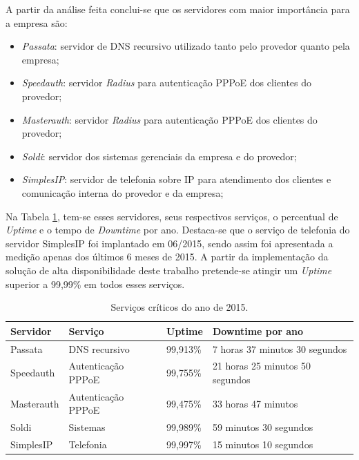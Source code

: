 A partir da análise feita conclui-se que os servidores com maior importância para a empresa são:
\begin{itemize}
 \item \textit{Passata}: servidor de \ac{DNS} recursivo utilizado tanto pelo provedor quanto pela empresa;
 \item \textit{Speedauth}: servidor \textit{Radius} para autenticação \ac{PPPoE} dos clientes do provedor;
 \item \textit{Masterauth}: servidor \textit{Radius} para autenticação \ac{PPPoE} dos clientes do provedor;
 \item \textit{Soldi}: servidor dos sistemas gerenciais da empresa e do provedor;
 \item \textit{SimplesIP}: servidor de telefonia sobre \ac{IP} para atendimento dos clientes e comunicação interna do provedor e da empresa;
\end{itemize}

Na Tabela \ref{tab:dispservcrit}, tem-se esses servidores, seus respectivos serviços, o percentual de \textit{Uptime} e o tempo de 
\textit{Downtime} por ano. Destaca-se que o serviço de telefonia do servidor SimplesIP foi implantado em 06/2015, sendo assim foi apresentada a 
medição apenas dos últimos 6 meses de 2015.
A partir da implementação da solução de alta disponibilidade deste trabalho pretende-se atingir um \textit{Uptime} superior a 99,99\% em
todos esses serviços.

\begin{table}[h!]
\caption{Serviços críticos do ano de 2015.}
\label{tab:dispservcrit}
\begin{center}
\begin{tabular}{|l|l|l|l|}\hline
\textbf{Servidor} & \textbf{Serviço} & \textbf{Uptime} & \textbf{Downtime por ano} \\\hline
Passata & DNS recursivo & 99,913\% & 7 horas 37 minutos 30 segundos \\\hline
Speedauth & Autenticação \ac{PPPoE} & 99,755\% & 21 horas 25 minutos 50 segundos \\\hline
Masterauth & Autenticação \ac{PPPoE} & 99,475\% & 33 horas 47 minutos \\\hline
Soldi & Sistemas & 99,989\% & 59 minutos 30 segundos \\\hline
SimplesIP & Telefonia & 99,997\% & 15 minutos 10 segundos \\\hline %
\end{tabular}
\end{center}
\end{table}


